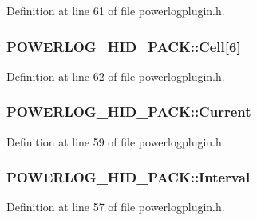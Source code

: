 Definition at line 61 of file powerlogplugin.\-h.

\hypertarget{struct_p_o_w_e_r_l_o_g___h_i_d___p_a_c_k_a13d6b3eadb4447aa5353664cf897a504}{
\subsubsection[{Cell}]{ P\-O\-W\-E\-R\-L\-O\-G\-\_\-\-H\-I\-D\-\_\-\-P\-A\-C\-K\-::\-Cell\mbox{[}6\mbox{]}}}\label{struct_p_o_w_e_r_l_o_g___h_i_d___p_a_c_k_a13d6b3eadb4447aa5353664cf897a504}


Definition at line 62 of file powerlogplugin.\-h.

\hypertarget{struct_p_o_w_e_r_l_o_g___h_i_d___p_a_c_k_af7ee71154ffb1eb06f52a5ddd6192dfc}{
\subsubsection[{Current}]{ P\-O\-W\-E\-R\-L\-O\-G\-\_\-\-H\-I\-D\-\_\-\-P\-A\-C\-K\-::\-Current}}\label{struct_p_o_w_e_r_l_o_g___h_i_d___p_a_c_k_af7ee71154ffb1eb06f52a5ddd6192dfc}


Definition at line 59 of file powerlogplugin.\-h.

\hypertarget{struct_p_o_w_e_r_l_o_g___h_i_d___p_a_c_k_ac134fb81539e13bd1050cf7dfc76e600}{
\subsubsection[{Interval}]{ P\-O\-W\-E\-R\-L\-O\-G\-\_\-\-H\-I\-D\-\_\-\-P\-A\-C\-K\-::\-Interval}}\label{struct_p_o_w_e_r_l_o_g___h_i_d___p_a_c_k_ac134fb81539e13bd1050cf7dfc76e600}


Definition at line 57 of file powerlogplugin.\-h.


